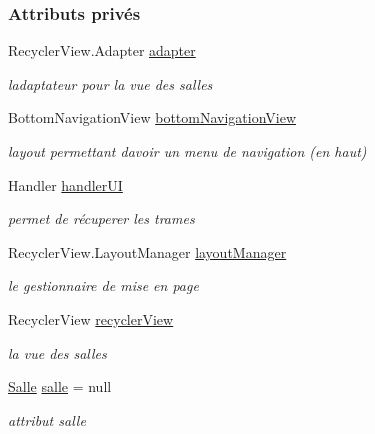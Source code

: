 \subsubsection*{Attributs privés}
\begin{DoxyCompactItemize}
\item 
Recycler\+View.\+Adapter \hyperlink{classcom_1_1lasalle_1_1meeting_1_1_main_activity_ac0af1346d6f4b3b4bd549b324c0523cc}{adapter}
\begin{DoxyCompactList}\small\item\em l\textquotesingle{}adaptateur pour la vue des salles \end{DoxyCompactList}\item 
Bottom\+Navigation\+View \hyperlink{classcom_1_1lasalle_1_1meeting_1_1_main_activity_abc43c4bd4402dd5b7066773a2276244b}{bottom\+Navigation\+View}
\begin{DoxyCompactList}\small\item\em layout permettant d\textquotesingle{}avoir un menu de navigation (en haut) \end{DoxyCompactList}\item 
Handler \hyperlink{classcom_1_1lasalle_1_1meeting_1_1_main_activity_a7cf3c4cd95f0f7cb43c077937f80ab8c}{handler\+UI}
\begin{DoxyCompactList}\small\item\em permet de récuperer les trames \end{DoxyCompactList}\item 
Recycler\+View.\+Layout\+Manager \hyperlink{classcom_1_1lasalle_1_1meeting_1_1_main_activity_aab6810c357c5c87b60466bd82b691f98}{layout\+Manager}
\begin{DoxyCompactList}\small\item\em le gestionnaire de mise en page \end{DoxyCompactList}\item 
Recycler\+View \hyperlink{classcom_1_1lasalle_1_1meeting_1_1_main_activity_a365f2a56de5a65551e62a12708b917f8}{recycler\+View}
\begin{DoxyCompactList}\small\item\em la vue des salles \end{DoxyCompactList}\item 
\hyperlink{classcom_1_1lasalle_1_1meeting_1_1_salle}{Salle} \hyperlink{classcom_1_1lasalle_1_1meeting_1_1_main_activity_a5d76e925ebb88ff19eca5a30b5ca4588}{salle} = null
\begin{DoxyCompactList}\small\item\em attribut salle \end{DoxyCompactList}\item 

\end{DoxyCompactItemize}
